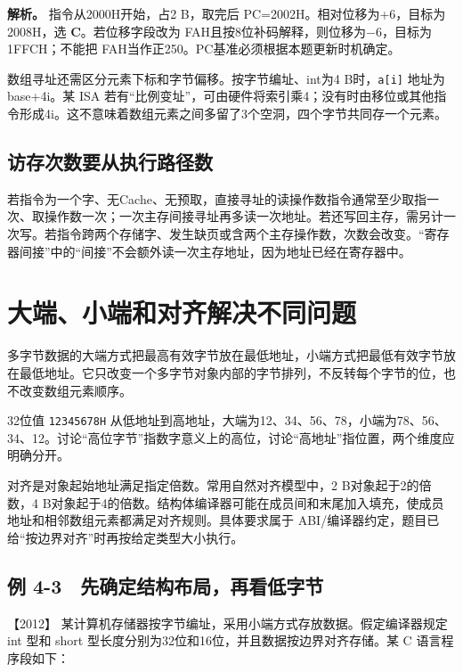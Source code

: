 
\textbf{解析。} 指令从2000H开始，占2 B，取完后 PC=2002H。相对位移为+6，目标为2008H，选 \textbf{C}。若位移字段改为 FAH且按8位补码解释，则位移为−6，目标为1FFCH；不能把 FAH当作正250。PC基准必须根据本题更新时机确定。

数组寻址还需区分元素下标和字节偏移。按字节编址、int为4 B时，\allowbreak{}\texttt{a{[}i{]}} 地址为base+4i。某 ISA 若有``比例变址''，可由硬件将索引乘4；没有时由移位或其他指令形成4i。这不意味着数组元素之间多留了3个空洞，四个字节共同存一个元素。

\subsection{访存次数要从执行路径数}\label{co-c04-h50}

若指令为一个字、无Cache、无预取，直接寻址的读操作数指令通常至少取指一次、取操作数一次；一次主存间接寻址再多读一次地址。若还写回主存，需另计一次写。若指令跨两个存储字、发生缺页或含两个主存操作数，次数会改变。``寄存器间接''中的``间接''不会额外读一次主存地址，因为地址已经在寄存器中。

\section{大端、小端和对齐解决不同问题}\label{co-04-03}

多字节数据的大端方式把最高有效字节放在最低地址，小端方式把最低有效字节放在最低地址。它只改变一个多字节对象内部的字节排列，不反转每个字节的位，也不改变数组元素顺序。

32位值 \allowbreak{}\texttt{12345678H} 从低地址到高地址，大端为12、34、56、78，小端为78、56、34、12。讨论``高位字节''指数字意义上的高位，讨论``高地址''指位置，两个维度应明确分开。

对齐是对象起始地址满足指定倍数。常用自然对齐模型中，2 B对象起于2的倍数，4 B对象起于4的倍数。结构体编译器可能在成员间和末尾加入填充，使成员地址和相邻数组元素都满足对齐规则。具体要求属于 ABI/编译器约定，题目已给``按边界对齐''时再按给定类型大小执行。

\subsection{例 4-3　先确定结构布局，再看低字节}\label{co-ex4-3}

\noindent{}【2012】 某计算机存储器按字节编址，采用小端方式存放数据。假定编译器规定 int 型和 short 型长度分别为32位和16位，并且数据按边界对齐存储。某 C 语言程序段如下：


